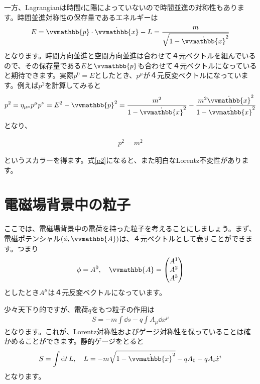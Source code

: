 \documentclass[report,paper=a4, fontsize=12pt, line_length=16cm, number_of_lines=33,dvipdfmx]{jlreq}
\newenvironment{important}{\begin{tcolorbox}[
  colback = white,
  colframe = red!35,
  boxrule = 2mm,
  fonttitle = \bfseries,
  after = \noindent] }{\end{tcolorbox}}
\numberwithin{equation}{chapter}
\newcommand{\xb}{\vvmathbb{x}}
\newcommand{\pbb}{\vvmathbb{p}}
\newcommand{\Ab}{\vvmathbb{A}}
\begin{document}
一方、Lagrangianは時間$t$に陽によっていないので時間並進の対称性もあります。時間並進対称性の保存量であるエネルギーは
\begin{align}
  E=\pbb\cdot \dot{\xb}-L=\frac{m}{\sqrt{1-\dot{\xb}^2}}
\end{align}
となります。時間方向並進と空間方向並進は合わせて４元ベクトルを組んでいるので、その保存量である$E$と$\pbb$も合わせて４元ベクトルになっていると期待できます。実際$p^0=E$としたとき、$p^{\mu}$が４元反変ベクトルになっています。例えば$p^2$を計算してみると
\begin{align}
  p^2=\eta_{\mu\nu}p^{\mu}p^{\nu}=E^2-\pbb^2
=\frac{m^2}{1-\dot{\xb}^2}-\frac{m^2\dot{\xb}^2}{1-\dot{\xb}^2}
\end{align}
となり、
\begin{important}
  \begin{align}
    p^2=m^2\label{p2}
  \end{align}  
\end{important}
というスカラーを得ます。式\eqref{p2}になると、また明白なLorentz不変性があります。

\section{電磁場背景中の粒子}
ここでは、電磁場背景中の電荷を持った粒子を考えることにしましょう。まず、電磁ポテンシャル$(\phi, \Ab)$は、４元ベクトルとして表すことができます。つまり
\begin{align}
  \phi=A^0,\quad \Ab=\mqty(A^1 \\ A^2 \\ A^3)
\end{align}
としたとき$A^{\mu}$は４元反変ベクトルになっています。

少々天下り的ですが、電荷$q$をもつ粒子の作用は
\begin{align}
  S=-m\int \dd{s}-q\int A_{\mu}\dd{x}^{\mu}
\end{align}
となります。これが、Lorentz対称性およびゲージ対称性を保っていることは確かめることができます。静的ゲージをとると
\begin{align}
  S=\int \dd{t}L,\quad
  L=-m\sqrt{1-\dot{\xb}^2}-qA_{0}-qA_{i}\dot{x}^{i}
  \label{emstaticgauge}
\end{align}
となります。
\end{document}
